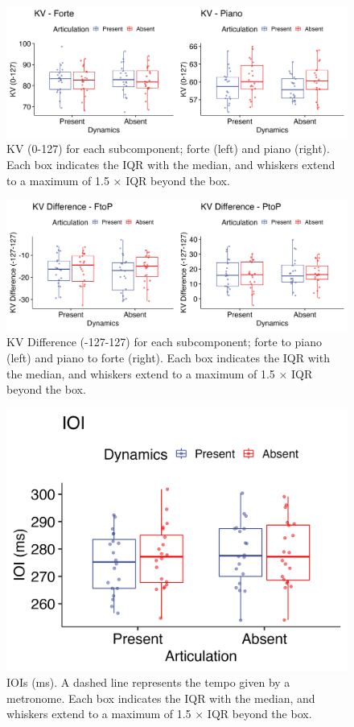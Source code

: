 \documentclass[
  man,floatsintext]{apa6}
\begin{document}
\begin{figure}
\includegraphics[width=1\linewidth]{manuscript_files/figure-latex/plot-vel-1-1} \caption{\label{fig:vel-1}KV (0-127) for each subcomponent; forte (left) and piano (right). Each box indicates the IQR with the median, and whiskers extend to a maximum of 1.5 × IQR beyond the box.}\label{fig:plot-vel-1}
\end{figure}

\begin{figure}
\includegraphics[width=1\linewidth]{manuscript_files/figure-latex/plot-vel-diff-1-1} \caption{\label{fig:vel-diff-1}KV Difference (-127-127) for each subcomponent; forte to piano (left) and piano to forte (right). Each box indicates the IQR with the median, and whiskers extend to a maximum of 1.5 × IQR beyond the box.}\label{fig:plot-vel-diff-1}
\end{figure}

\begin{figure}
\includegraphics[width=1\linewidth]{manuscript_files/figure-latex/plot-ioi-1-1} \caption{\label{fig:ioi-1}IOIs (ms). A dashed line represents the tempo given by a metronome. Each box indicates the IQR with the median, and whiskers extend to a maximum of 1.5 × IQR beyond the box.}\label{fig:plot-ioi-1}
\end{figure}
\end{document}
